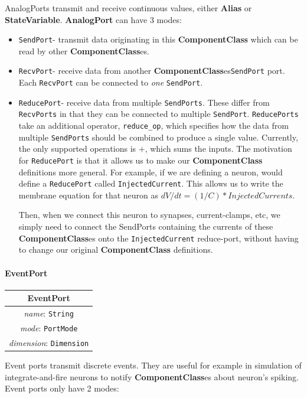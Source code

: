 \documentclass{article}
\newcommand{\ComponentClass}{{\bf{ComponentClass}}\xspace}
\newcommand{\ComponentClasses}{{\bf{ComponentClass}}es\xspace}
\newcommand{\StateVariable}{{\bf{StateVariable}}\xspace}
\newcommand{\Alias}{{\bf{Alias}}\xspace}
\newcommand{\AnalogPort}{{\bf{AnalogPort}}\xspace}
\newcommand{\SendPort}{{\tt{SendPort}}\xspace}
\newcommand{\RecvPort}{{\tt{RecvPort}}\xspace}
\newcommand{\ReducePort}{{\tt{ReducePort}}\xspace}
\newcommand{\SendPorts}{{\tt{SendPorts}}\xspace}
\newcommand{\RecvPorts}{{\tt{RecvPorts}}\xspace}
\newcommand{\ReducePorts}{{\tt{ReducePorts}}\xspace}
\begin{document}
AnalogPorts transmit and receive continuous values, either \Alias
or \StateVariable. \AnalogPort can have 3 modes:
\begin{itemize}
\item \SendPort - transmit data originating in this \ComponentClass which can
be read by other \ComponentClasses.
\item \RecvPort - receive data from another \ComponentClasses \SendPort
port. Each \RecvPort can be connected to \emph{one} \SendPort.
\item \ReducePort - receive data from multiple \SendPorts. These
differ from \RecvPorts in that they can be connected to multiple
\SendPort. \ReducePorts take an additional operator,
{\tt reduce\_op}, which specifies how the data from multiple \SendPorts
should be combined to produce a single value. Currently, the
only supported operations is $+$, which sums the inputs.
The motivation for \ReducePort is that it allows us to make our
\ComponentClass definitions more general. For example, if we are defining a
neuron, would define a \ReducePort called {\tt InjectedCurrent}.
This allows us to write the membrane equation for that neuron as
$dV/dt = (1/C) * InjectedCurrents$.

Then, when we connect this neuron to synapses, current-clamps, etc, we
simply need to connect the SendPorts containing the currents of these
\ComponentClasses onto the {\tt InjectedCurrent} reduce-port, without having
to change our original \ComponentClass definitions.
\end{itemize}

\paragraph{EventPort}

\begin{table}[htb]
\center
\begin{tabular}{|c|}
\hline
\hline
EventPort \\
\hline
\hline
{\em name}: {\tt String} \\
\hline
{\em mode}: {\tt PortMode} \\
\hline
{\em dimension}: {\tt Dimension} \\
\hline
\end{tabular}
\end{table}

Event ports transmit discrete events. They are useful for example in
simulation of integrate-and-fire neurons to notify \ComponentClasses about neuron's
spiking. Event ports only have 2 modes:
\end{document}
